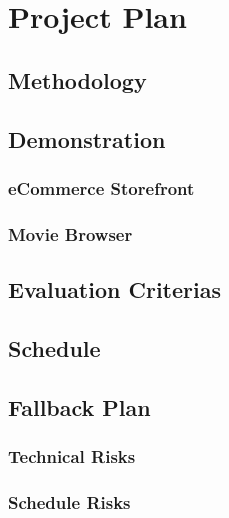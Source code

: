 \chapter{Project Plan}

\section{Methodology}


\section{Demonstration}


\subsection{eCommerce Storefront}


\subsection{Movie Browser}


\section{Evaluation Criterias}


\section{Schedule}


\section{Fallback Plan}

\subsection{Technical Risks}

\subsection{Schedule Risks}

